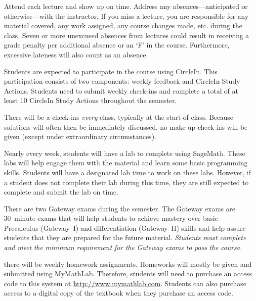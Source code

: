 \documentclass[11pt,letterpaper]{article}
\begin{document}
Attend each lecture and show up on time. Address any absences---anticipated or otherwise---with the instructor. If you miss a lecture, you are responsible for any material covered, any work assigned, any course changes made, etc. during the class. Seven or more unexcused absences from lectures could result in receiving a grade penalty per additional absence or an `F' in the course. Furthermore, excessive lateness will also count as an absence. 
\pspace


Students are expected to participate in the course using CircleIn. This participation consists of two components: weekly feedback and CircleIn Study Actions. Students need to submit weekly check-ins and complete a total of at least 10 CircleIn Study Actions throughout the semester. 
\pspace



There will be a check-ins \textit{every} class, typically at the start of class. Because solutions will often then be immediately discussed, no make-up check-ins will be given (except under extraordinary circumstances). \pspace



Nearly every week, students will have a lab to complete using SageMath. These labs will help engage them with the material and learn some basic programming skills. Students will have a designated lab time to work on these labs. However, if a student does not complete their lab during this time, they are still expected to complete and submit the lab on time.
\pspace



There are two Gateway exams during the semester. The Gateway exams are 30~minute exams that will help students to achieve mastery over basic Precalculus (Gateway~I) and differentiation (Gateway~II) skills and help assure students that they are prepared for the future material. {\itshape Students must complete and meet the minimum requirement for the Gateway exams to pass the course.}
\pspace


there will be weekly homework assignments. Homeworks will mostly be given and submitted using MyMathLab. Therefore, students will need to purchase an access code to this system at \url{http://www.mymathlab.com}. Students can also purchase access to a digital copy of the textbook when they purchase an access code.
\pspace
\end{document}
